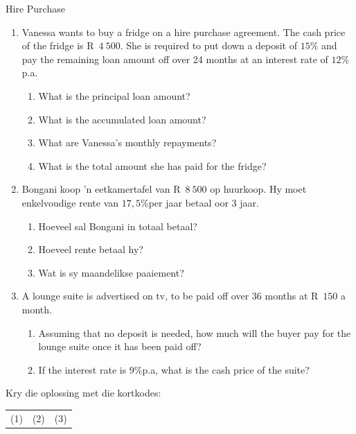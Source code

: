 \begin{exercises}{Hire Purchase}
    \begin{enumerate}[label=\textbf{\arabic*}.]
	\item Vanessa wants to buy a fridge on a hire purchase agreement. The cash price of the fridge is R~$4~500$. She is required to put down a deposit of $15\%$ and pay the remaining loan amount off over 24 months at an interest rate of $12\%$ p.a.
	\begin{enumerate}
	    \item What is the principal loan amount?
	    \item What is the accumulated loan amount?
	    \item What are Vanessa’s monthly repayments?
	    \item What is the total amount she has paid for the fridge?
	\end{enumerate}


	\item Bongani koop ’n eetkamertafel van R~$8~500$ op huurkoop. Hy moet enkelvoudige rente van $17,5\%$per jaar
betaal oor 3 jaar.
	\begin{enumerate}
	    \item Hoeveel sal Bongani in totaal betaal?
	    \item  Hoeveel rente betaal hy?
	    \item Wat is sy maandelikse paaiement?
	\end{enumerate}

	\item A lounge suite is advertised on tv, to be paid off over 36 months at R~$150$ a month.
	\begin{enumerate}
	    \item Assuming that no deposit is needed, how much will the buyer pay for the lounge suite once it has been paid off?
	    \item If the interest rate is $9\%$p.a, what is the cash price of the suite?\\
	\end{enumerate}
    \end{enumerate}

    Kry die oplossing met die kortkodes:\\
    \begin{tabularx}{\textwidth}{ XXX }
	(1)	&	(2)	&	(3)\\
    \end{tabularx}
\end{exercises}


